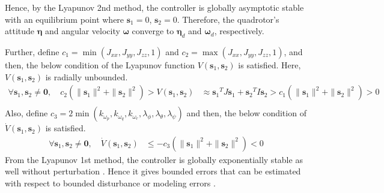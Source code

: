 \color{black} %
Hence, by the Lyapunov 2nd method, the controller is globally asymptotic stable with an equilibrium point where \( {\boldsymbol s_1} =  0\), \( {\boldsymbol s_2} =  0\). Therefore, the quadrotor's attitude \({\boldsymbol \eta}\) and angular velocity \({\boldsymbol \omega}\) converge to \({\boldsymbol \eta}_d\) and \({\boldsymbol \omega}_d \), respectively.

Further, define \(c_1 =  \min(J_{xx}, J_{yy}, J_{zz}, 1) \) and \(c_2 =  \max(J_{xx}, J_{yy}, J_{zz}, 1) \), and then, the below condition of the Lyapunov function \({V} ({\boldsymbol s}_1, {\boldsymbol s}_2) \) is satisfied. Here, \({V} ({\boldsymbol s}_1, {\boldsymbol s}_2) \) is radially unbounded. \\
\begin{equation}
\begin{aligned}
\forall {\boldsymbol s}_1, {\boldsymbol s}_2 \neq {\boldsymbol 0}, \quad  c_2 (\|{{\boldsymbol s}_1}\|^2 +\|{{\boldsymbol s}_2}\|^2) > V({\boldsymbol s}_1, {\boldsymbol s}_2) & \approx  {{\boldsymbol s}_1}^{T} J {\boldsymbol s}_1 + {{\boldsymbol s}_2}^{T} I {\boldsymbol s}_2  >  c_1 (\|{{\boldsymbol s}_1}\|^2 +\|{{\boldsymbol s}_2}\|^2) > 0\\
\end{aligned}
\end{equation} 
Also, define \(c_3 = 2 \min(k_{\omega_p}, k_{\omega_q}, k_{\omega_r}, \lambda_{\phi}, \lambda_{\theta}, \lambda_{\psi}) \) and then, the below condition of \(\dot{V} ({\boldsymbol s}_1, {\boldsymbol s}_2) \) is satisfied.
\begin{equation}
\begin{aligned}
\forall {\boldsymbol s}_1, {\boldsymbol s}_2 \neq {\boldsymbol 0}, \quad \dot{V} ({\boldsymbol s}_1, {\boldsymbol s}_2) & \le - c_3 (\|{{\boldsymbol s}_1}\|^2 +\|{{\boldsymbol s}_2}\|^2) < 0
\end{aligned}
\end{equation} 
From the Lyapunov 1st method, the controller is globally exponentially stable as well without perturbation \cite{nonlinear_systems}. Hence it gives bounded errors that can be estimated with respect to bounded disturbance or modeling errors \cite{Bandyopadhyay16}.